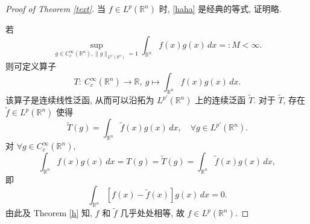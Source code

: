 \documentclass[a4paper,11pt]{article}
\theoremstyle{definition}
\begin{document}
\begin{proof}[Proof of Theorem \ref{text}]
    当 $ f \in L^p(\mathbb{R}^n) $ 时, \eqref{haha} 是经典的等式, 证明略.
    
    若
    $$
        \sup_{g \in C_c^\infty(\mathbb{R}^n), \| g \|_{L^{p'}(\mathbb{R}^n)} = 1} 
            \int_{\mathbb{R}^n} f(x) g(x) \, dx =: M < \infty.
    $$
    则可定义算子
    $$
        T :\ C_c^\infty(\mathbb{R}^n) \to \mathbb{R},\ g \mapsto \int_{\mathbb{R}^n} f(x) g(x) \, dx.
    $$
    该算子是连续线性泛函, 从而可以沿拓为 $ L^{p'}(\mathbb{R}^n) $ 上的连续泛函 $ \widetilde{T} $.
    对于 $ \widetilde{T} $, 存在 $ \tilde{f} \in L^p(\mathbb{R}^n) $ 使得 
    $$
        \widetilde{T}(g) = \int_{\mathbb{R}^n} \tilde{f}(x) g(x) \, dx, \quad \forall g \in L^{p'}(\mathbb{R}^n).
    $$
    对 $ \forall g \in C_c^\infty(\mathbb{R}^n) $,
    $$
        \int_{\mathbb{R}^n} f(x) g(x) \, dx = T(g) = \widetilde{T}(g) = \int_{\mathbb{R}^n} \tilde{f}(x) g(x) \, dx,
    $$
    即
    $$
        \int_{\mathbb{R}^n} \left[f(x) - \tilde{f}(x)\right] g(x) \, dx = 0.
    $$
    由此及 Theorem \ref{h} 知, $ f $ 和 $ \tilde{f} $ 几乎处处相等, 故 $ f \in L^p(\mathbb{R}^n) $.
\end{proof}
\end{document}
